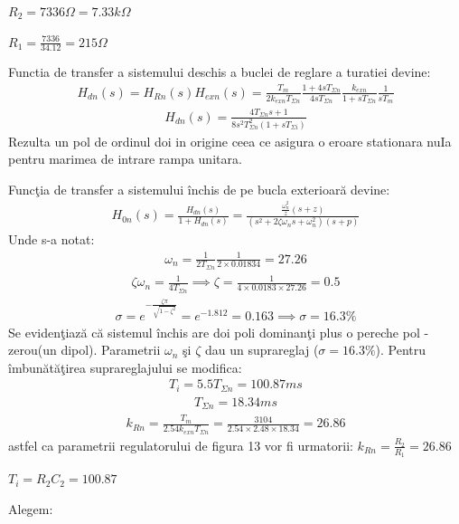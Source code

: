 \documentclass[11pt]{article}
\begin{document}
$R_2=7336 \Omega=7.33 k\Omega$

$R_1=\frac{7336}{34.12}=215 \Omega$

Functia de transfer a sistemului deschis a buclei de reglare a turatiei devine:
\begin{align*}
H_{dn}(s)=H_{Rn}(s)H_{exn}(s)=\frac{T_m}{2k_{exn}T_{\Sigma n}}\frac{1+4sT_{\Sigma n}}{4sT_{\Sigma n}}\frac{k_{exn}}{1+sT_{\Sigma n}}\frac{1}{sT_m}
\end{align*}
\begin{align*}
H_{dn}(s)=\frac{4T_{\Sigma n}s+1}{8s^2T_{\Sigma n}^2(1+sT_{\Sigma i})}
\end{align*}
Rezulta un pol de ordinul doi in origine ceea ce asigura o eroare stationara nuIa pentru marimea de intrare rampa unitara.

Funcţia de transfer a sistemului închis de pe bucla exterioară devine:
\begin{align*}
H_{0n}(s)=\frac{H_{dn}(s)}{1+H_{dn}(s)}=\frac{\frac{\omega_n^2}{z}(s+z)}{(s^2+2\zeta\omega_ns+\omega_n^2)(s+p)}
\end{align*}
Unde s-a notat:
\begin{align*}
\omega_n=\frac{1}{2T_{\Sigma n}}\frac{1}{2\times 0.01834}=27.26
\end{align*}
\begin{align*}
\zeta\omega_n=\frac{1}{4T_{\Sigma n}}\implies\zeta=\frac{1}{4\times 0.0183\times 27.26}=0.5
\end{align*}
\begin{align*}
\sigma=e^{-\frac{\zeta \pi}{\sqrt{1-\zeta^2}}}=e^{-1.812}=0.163\implies\sigma=16.3 \%
\end{align*}
Se evidenţiază că sistemul închis are doi poli dominanţi plus o pereche pol - zerou(un dipol). Parametrii $\omega_n$ şi $\zeta$ dau un suprareglaj ($\sigma = 16.3\% $). Pentru îmbunătăţirea suprareglajului se modifica:
\begin{align*}
T_i=5.5T_{\Sigma n}=100.87 ms
\end{align*}
\begin{align*}
T_{\Sigma n}=18.34ms
\end{align*}
\begin{align*}
k_{Rn}=\frac{T_m}{2.54k_{exn}T_{\Sigma n}}=\frac{3104}{2.54 \times 2.48 \times 18.34}=26.86
\end{align*}
astfel ca parametrii regulatorului de figura 13 vor fi urmatorii:
$k_{Rn}=\frac{R_2}{R_1}=26.86$

$T_i=R_2C_2=100.87$

Alegem:
\end{document}
